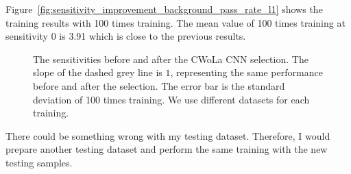 \documentclass[12pt]{article}
\begin{document}
		Figure~\ref{fig:sensitivity_improvement_background_pass_rate_l1} shows the training results with 100 times training. The mean value of 100 times training at sensitivity 0 is 3.91 which is close to the previous results.
        \begin{figure}[htpb]
            \centering
            \caption{The sensitivities before and after the CWoLa CNN selection. The slope of the dashed grey line is $1$, representing the same performance before and after the selection. The error bar is the standard deviation of 100 times training. We use different datasets for each training.}
            \label{fig:sensitivity_improvement_100_random_seed}
        \end{figure}

		There could be something wrong with my testing dataset. Therefore, I would prepare another testing dataset and perform the same training with the new testing samples.



\end{document}
